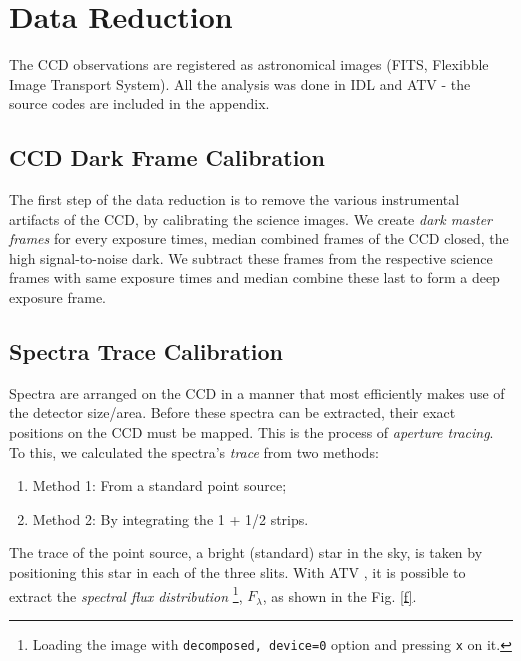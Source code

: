 \section{Data Reduction}

The CCD observations are registered as astronomical images (FITS, Flexibble
Image Transport System). All the
analysis was done in IDL and ATV \cite{atv} - the source codes are
included in the appendix.




\subsection{CCD Dark Frame Calibration}

The first step of the data reduction is to remove the various instrumental
artifacts of the CCD, by calibrating  the science images. We create {\it dark
master frames} for every exposure times, \ie median combined frames of the CCD
closed, the high signal-to-noise dark. We subtract these frames from the
respective science frames with same exposure times and median combine these
last to form a deep exposure frame.


\subsection{Spectra Trace Calibration}

Spectra are arranged on the CCD in a manner that most efficiently makes
use of the detector size/area. Before these spectra can be extracted, their
exact positions on the CCD must be mapped. This is the process of {\it 
aperture tracing}. To this, we calculated the  spectra's {\it trace} from two
methods:
\begin{enumerate}
 \item Method 1: From a standard point source;
\item Method 2: By integrating the 1 + 1/2 strips.
\end{enumerate}

The trace of the point source, \eg a bright
(standard) star in the sky, is taken by positioning this star in each of the
three slits.
With ATV \cite{atv}, it is possible to extract the {\it spectral flux
distribution} \footnote{Loading the image with \texttt{decomposed, device=0}
option and pressing \texttt{x} on it.}, $F_{\lambda}$,  as shown in the Fig.
\ref{f}.

